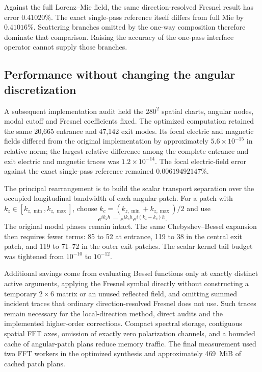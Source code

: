 \documentclass[11pt,a4paper]{article}
\numberwithin{equation}{section}
\begin{document}
Against the full Lorenz--Mie field, the same direction-resolved Fresnel result
has error $0.41020\%$. The exact single-pass reference itself differs from full
Mie by $0.41016\%$. Scattering branches omitted by the one-way composition
therefore dominate that comparison. Raising the accuracy of the one-pass
interface operator cannot supply those branches.

\subsection{Performance without changing the angular discretization}

A subsequent implementation audit held the $280^2$ spatial charts, angular
nodes, modal cutoff and Fresnel coefficients fixed. The optimized computation
retained the same 20,665 entrance and 47,142 exit modes. Its focal electric and
magnetic fields differed from the original implementation by approximately
$5.6\times10^{-15}$ in relative norm; the largest relative difference among
the complete entrance and exit electric and magnetic traces was
$1.2\times10^{-14}$. The focal electric-field error against the exact
single-pass reference remained $0.00619492147\%$.

The principal rearrangement is to build the scalar transport separation over
the occupied longitudinal bandwidth of each angular patch. For a patch with
$k_z\in[k_{z,\min},k_{z,\max}]$, choose
$k_c=(k_{z,\min}+k_{z,\max})/2$ and use
\begin{equation}
 e^{i k_z h}=e^{i k_c h}e^{i(k_z-k_c)h}.
\end{equation}
The original modal phases remain intact. The same Chebyshev--Bessel expansion
then requires fewer terms: 85 to 52 at entrance, 119 to 38 in the central exit
patch, and 119 to 71--72 in the outer exit patches. The scalar kernel tail
budget was tightened from $10^{-10}$ to $10^{-12}$.

Additional savings come from evaluating Bessel functions only at exactly
distinct active arguments, applying the Fresnel symbol directly without
constructing a temporary $2\times6$ matrix or an unused reflected field, and
omitting summed incident traces that ordinary direction-resolved Fresnel does
not use. Such traces remain necessary for the local-direction method, direct
audits and the implemented higher-order corrections. Compact spectral storage,
contiguous spatial FFT axes, omission of exactly zero polarization channels,
and a bounded cache of angular-patch plans reduce memory traffic. The final
measurement used two FFT workers in the optimized synthesis and approximately
469~MiB of cached patch plans.
\end{document}
